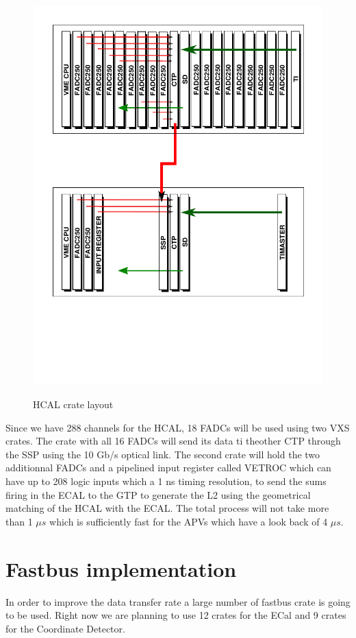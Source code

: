 \documentclass{article}
\begin{document}
\begin{figure}
  \centering
  \includegraphics[width=\textwidth]{figs/VXSHCalFADC.pdf}\\
  \caption{HCAL crate layout }\label{fig:HCALFADC}
\end{figure}

Since we have 288 channels for the HCAL, 18 FADCs will be used using two VXS crates. The crate with all 16 FADCs will send its data ti theother CTP through the SSP using the 10 Gb/s optical link. The second crate will hold the two additionnal FADCs and a pipelined input register called VETROC which can have up to 208 logic inputs which a 1 ns timing resolution, to send the sums firing in the ECAL to the GTP to generate the L2 using the geometrical matching of the HCAL with the ECAL. The total process will not take more than 1 $\mu s$ which is sufficiently fast for the APVs which have a look back of 4 $\mu s$.

\section{Fastbus implementation} 
In order to improve the data transfer rate a large number of fastbus crate is going to be used.
Right now we are planning to use 12 crates for the ECal and 9 crates for the Coordinate Detector.
\end{document}
